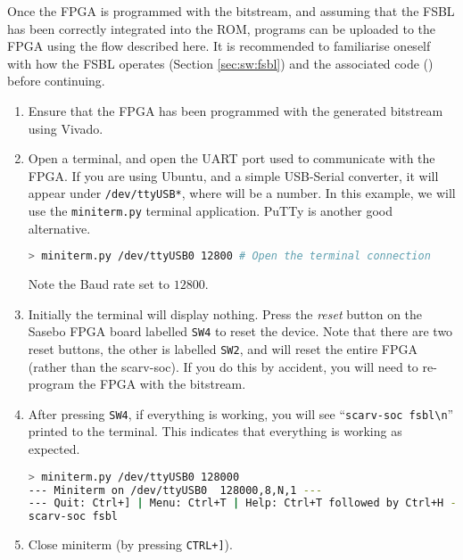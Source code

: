 Once the FPGA is programmed with the bitstream, and assuming that
the FSBL has been correctly integrated into the ROM, programs can
be uploaded to the FPGA using the flow described here.
It is recommended to familiarise oneself with how the FSBL operates
(Section \ref{sec:sw:fsbl}) and the associated
code () before continuing.

\begin{enumerate}
\item Ensure that the FPGA has been programmed with the
      generated bitstream using Vivado.

\item Open a terminal, and open the UART port used to communicate with
      the FPGA. If you are using Ubuntu, and a simple USB-Serial
      converter, it will appear under {\tt /dev/ttyUSB*}, where {\tt *}
      will be a number.
      In this example, we will use the {\tt miniterm.py} terminal
      application. PuTTy is another good alternative.

\begin{lstlisting}[style=block, language=bash]
> miniterm.py /dev/ttyUSB0 12800 # Open the terminal connection
\end{lstlisting}

      Note the Baud rate set to $12800$.

\item Initially the terminal will display nothing.
      Press the {\em reset} button on the Sasebo FPGA board labelled
      {\tt SW4} to reset the device.
      Note that there are two reset buttons, the other is labelled
      {\tt SW2}, and will reset the entire FPGA (rather than the
      scarv-soc). If you do this by accident, you will need to re-program
      the FPGA with the bitstream.

\item After pressing {\tt SW4}, if everything is working, you will see
      ``{\tt scarv-soc fsbl\textbackslash n}'' printed to the terminal.
      This indicates that everything is working as expected.

\begin{lstlisting}[style=block,language=bash]
> miniterm.py /dev/ttyUSB0 128000
--- Miniterm on /dev/ttyUSB0  128000,8,N,1 ---
--- Quit: Ctrl+] | Menu: Ctrl+T | Help: Ctrl+T followed by Ctrl+H ---
scarv-soc fsbl
\end{lstlisting}

\item Close miniterm (by pressing {\tt CTRL+]}).


\end{enumerate}
